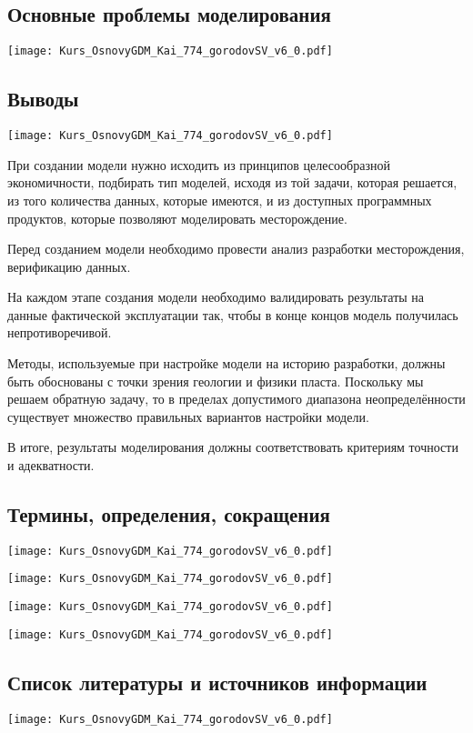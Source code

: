 \documentclass[main.tex]{subfiles}
\begin{document}
\subsection{Основные проблемы моделирования}

\texttt{[image: Kurs\_OsnovyGDM\_Kai\_774\_gorodovSV\_v6\_0.pdf]}

\subsection{Выводы}

\texttt{[image: Kurs\_OsnovyGDM\_Kai\_774\_gorodovSV\_v6\_0.pdf]}

При создании модели нужно исходить из принципов целесообразной экономичности, подбирать тип моделей, исходя из той задачи, которая решается, из того количества данных, которые имеются, и из доступных программных продуктов, которые позволяют моделировать месторождение.

Перед созданием модели необходимо провести анализ разработки месторождения, верификацию данных.

На каждом этапе создания модели необходимо валидировать результаты на данные фактической эксплуатации так, чтобы в конце концов модель получилась непротиворечивой.

Методы, используемые при настройке модели на историю разработки, должны быть обоснованы с точки зрения геологии и физики пласта.
Поскольку мы решаем обратную задачу, то в пределах допустимого диапазона неопределённости существует множество правильных вариантов настройки модели.

В итоге, результаты моделирования должны соответствовать критериям точности и адекватности.

\subsection{Термины, определения, сокращения}

\texttt{[image: Kurs\_OsnovyGDM\_Kai\_774\_gorodovSV\_v6\_0.pdf]}

\texttt{[image: Kurs\_OsnovyGDM\_Kai\_774\_gorodovSV\_v6\_0.pdf]}

\texttt{[image: Kurs\_OsnovyGDM\_Kai\_774\_gorodovSV\_v6\_0.pdf]}

\texttt{[image: Kurs\_OsnovyGDM\_Kai\_774\_gorodovSV\_v6\_0.pdf]}

\subsection{Список литературы и источников информации}

\texttt{[image: Kurs\_OsnovyGDM\_Kai\_774\_gorodovSV\_v6\_0.pdf]}
\end{document}
